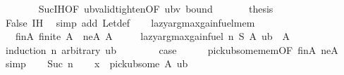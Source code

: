 \begin{isabellebody}
\ \ \ \ \ \ \isamarkupfalse%
\ Suc{\isachardot}{\kern0pt}IH{\isacharbrackleft}{\kern0pt}OF\ ub{\isacharunderscore}{\kern0pt}valid{\isacharunderscore}{\kern0pt}tighten{\isacharbrackleft}{\kern0pt}OF\ ubv{\isacharbrackright}{\kern0pt}\ bound{\isacharprime}{\kern0pt}{\isacharbrackright}{\kern0pt}\ \isakeywordONE{{\isachardot}{\kern0pt}}\isamarkupfalse%
\isanewline
\isanewline
\ \ \ \ \isamarkupfalse%
\ {\isacharquery}{\kern0pt}thesis\isanewline
\ \ \ \ \ \ \isamarkupfalse%
\ False\ IH\ \isamarkupfalse%
\ {\isacharparenleft}{\kern0pt}simp\ add{\isacharcolon}{\kern0pt}\ Let{\isacharunderscore}{\kern0pt}def{\isacharparenright}{\kern0pt}\isanewline
\ \ \isamarkupfalse%
\isanewline
{}\isamarkupfalse%
%
\endisatagproof
{\isafoldproof}%
%
\isadelimproof
\isanewline
%
\endisadelimproof
\isanewline
{}\isamarkupfalse%
\ lazy{\isacharunderscore}{\kern0pt}argmax{\isacharunderscore}{\kern0pt}gain{\isacharunderscore}{\kern0pt}fuel{\isacharunderscore}{\kern0pt}mem{\isacharcolon}{\kern0pt}\isanewline
\ \ \ finA{\isacharcolon}{\kern0pt}\ {\isachardoublequoteopen}finite\ A{\isachardoublequoteclose}\ \ neA{\isacharcolon}{\kern0pt}\ {\isachardoublequoteopen}A\ {\isasymnoteq}\ {\isacharbraceleft}{\kern0pt}{\isacharbraceright}{\kern0pt}{\isachardoublequoteclose}\isanewline
\ \ \ {\isachardoublequoteopen}lazy{\isacharunderscore}{\kern0pt}argmax{\isacharunderscore}{\kern0pt}gain{\isacharunderscore}{\kern0pt}fuel\ n\ S\ A\ ub\ {\isasymin}\ A{\isachardoublequoteclose}\isanewline
%
\isadelimproof
%
\endisadelimproof
%
\isatagproof
{}\isamarkupfalse%
\ {\isacharparenleft}{\kern0pt}induction\ n\ arbitrary{\isacharcolon}{\kern0pt}\ ub{\isacharparenright}{\kern0pt}\isanewline
\ \ \isamarkupfalse%
\ {}\isanewline
\ \ \isamarkupfalse%
\ {\isacharquery}{\kern0pt}case\isanewline
\ \ \ \ \isamarkupfalse%
\ pick{\isacharunderscore}{\kern0pt}ub{\isacharunderscore}{\kern0pt}some{\isacharunderscore}{\kern0pt}mem{\isacharbrackleft}{\kern0pt}OF\ finA\ neA{\isacharbrackright}{\kern0pt}\ \isamarkupfalse%
\ simp\isanewline
{}\isamarkupfalse%
\isanewline
\ \ \isamarkupfalse%
\ {\isacharparenleft}{\kern0pt}Suc\ n{\isacharparenright}{\kern0pt}\isanewline
\ \ \isamarkupfalse%
\ {\isacharquery}{\kern0pt}x\ {\isacharequal}{\kern0pt}\ {\isachardoublequoteopen}pick{\isacharunderscore}{\kern0pt}ub{\isacharunderscore}{\kern0pt}some\ A\ ub{\isachardoublequoteclose}\isanewline

\end{isabellebody}

